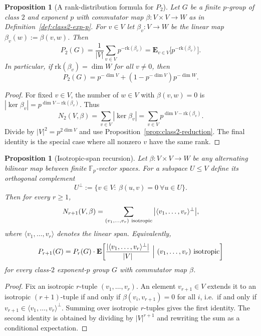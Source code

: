\documentclass[11pt]{article}
\newtheorem{proposition}[theorem]{Proposition}
\theoremstyle{definition}
\theoremstyle{remark}
\theoremstyle{definition}
\theoremstyle{plain}
\begin{document}
\begin{proposition}[A rank-distribution formula for $P_2$]\label{prop:P2-rankdistribution}
Let $G$ be a finite $p$-group of class $2$ and exponent $p$ with commutator map $\beta:V\times V\to W$ as in
Definition~\ref{def:class2-exp-p}.
For $v\in V$ let $\beta_v:V\to W$ be the linear map $\beta_v(w):=\beta(v,w)$.
Then
\[
P_2(G)=\frac{1}{|V|}\sum_{v\in V} p^{-\mathrm{rk}(\beta_v)}
=\mathbf E_{v\in V}\big[p^{-\mathrm{rk}(\beta_v)}\big].
\]
In particular, if $\mathrm{rk}(\beta_v)=\dim W$ for all $v\neq 0$, then
\[
P_2(G)=p^{-\dim V}+\left(1-p^{-\dim V}\right)p^{-\dim W}.
\]
\end{proposition}

\begin{proof}
For fixed $v\in V$, the number of $w\in V$ with $\beta(v,w)=0$ is $|\ker \beta_v|=p^{\dim V-\mathrm{rk}(\beta_v)}$.
Thus
\[
N_2(V,\beta)=\sum_{v\in V} |\ker \beta_v|
=\sum_{v\in V} p^{\dim V-\mathrm{rk}(\beta_v)}.
\]
Divide by $|V|^2=p^{2\dim V}$ and use Proposition~\ref{prop:class2-reduction}.
The final identity is the special case where all nonzero $v$ have the same rank.
\end{proof}

\begin{proposition}[Isotropic-span recursion]\label{prop:isotropic-span-recursion}
Let $\beta:V\times V\to W$ be any alternating bilinear map between finite $\mathbb F_p$-vector spaces.
For a subspace $U\le V$ define its orthogonal complement
\[
U^\perp:=\{v\in V:\ \beta(u,v)=0\ \forall u\in U\}.
\]
Then for every $r\ge 1$,
\[
N_{r+1}(V,\beta)=\sum_{(v_1,\dots,v_r)\ \text{\rm isotropic}} \big|\langle v_1,\dots,v_r\rangle^\perp\big|,
\]
where $\langle v_1,\dots,v_r\rangle$ denotes the linear span.
Equivalently,
\[
P_{r+1}(G)=P_r(G)\cdot \mathbf E\!\left[\frac{|\langle v_1,\dots,v_r\rangle^\perp|}{|V|}\ \Big|\ (v_1,\dots,v_r)\ \text{\rm isotropic}\right]
\]
for every class-$2$ exponent-$p$ group $G$ with commutator map $\beta$.
\end{proposition}

\begin{proof}
Fix an isotropic $r$-tuple $(v_1,\dots,v_r)$.
An element $v_{r+1}\in V$ extends it to an isotropic $(r+1)$-tuple if and only if
$\beta(v_i,v_{r+1})=0$ for all $i$, i.e.\ if and only if $v_{r+1}\in \langle v_1,\dots,v_r\rangle^\perp$.
Summing over isotropic $r$-tuples gives the first identity.
The second identity is obtained by dividing by $|V|^{r+1}$ and rewriting the sum as a conditional expectation.
\end{proof}
\end{document}
